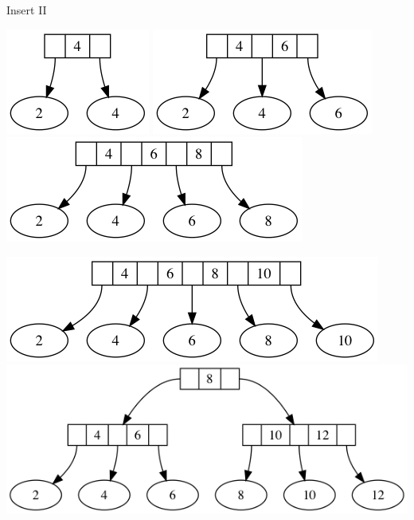 \documentclass[]{beamer}
\begin{document}
\begin{frame}{Insert II}
\begin{center}
\includegraphics[scale=0.3]{example_1.png} \hspace{0.3cm}
\includegraphics[scale=0.3]{example_2.png} \hspace{0.3cm}
\includegraphics[scale=0.3]{example_3.png} \hspace{0.3cm}

\vspace{1cm}
\includegraphics[scale=0.3]{example_4.png} \hspace{0.3cm}
\includegraphics[scale=0.3]{example_5.png} \hspace{0.3cm}
\end{center}
\end{frame}
\end{document}
